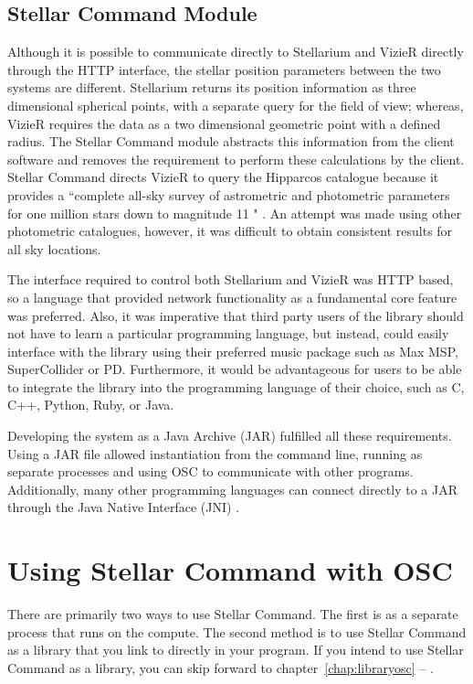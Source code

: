 \documentclass[10pt,a4paper,extrafontsizes]{memoir}
\begin{document}
\section{Stellar Command Module}
Although it is possible to communicate directly to Stellarium and VizieR directly through the HTTP interface, the stellar position parameters between the two systems are different. Stellarium returns its position information as three dimensional spherical points, with a separate query for the field of view; whereas, VizieR requires the data as a two dimensional geometric point with a defined radius. The Stellar Command module abstracts this information from the client software and removes the requirement to perform these calculations by the client. Stellar Command directs VizieR to query the Hipparcos catalogue because it provides a ``complete all-sky survey of astrometric and photometric parameters for one million stars down to magnitude 11 " \cite [p. ~201]{van1997hipparcos}. An attempt was made using other photometric catalogues, however, it was difficult to obtain consistent results for all sky locations.  

The interface required to control both Stellarium and VizieR was HTTP based, so a language that provided network functionality as a fundamental core feature was preferred. Also, it was imperative that third party users of the library should not have to learn a particular programming language, but instead, could easily interface with the library using their preferred music package such as Max MSP, SuperCollider or PD. Furthermore, it would be advantageous for users to be able to integrate the library  into the programming language of their choice, such as C, C++, Python, Ruby, or Java. 

Developing the system as a Java Archive (JAR) fulfilled all these requirements. Using a JAR file allowed instantiation from the command line, running as separate processes and using OSC to communicate with other programs. Additionally, many other programming languages can connect directly to a JAR through the Java Native Interface (JNI) \cite{liang1999java}. 




\cleardoublepage
{}

\mainmatter





\chapter{Using Stellar Command with OSC} \label{chap:launchosc}
There are primarily two ways to use Stellar Command. The first is as a separate process that runs on the compute. The second method is to use Stellar Command as a library that you link to directly in your program. If you intend to use Stellar Command as a library, you can skip forward to chapter~\ref{chap:libraryosc} --
\emph{}.
\end{document}
